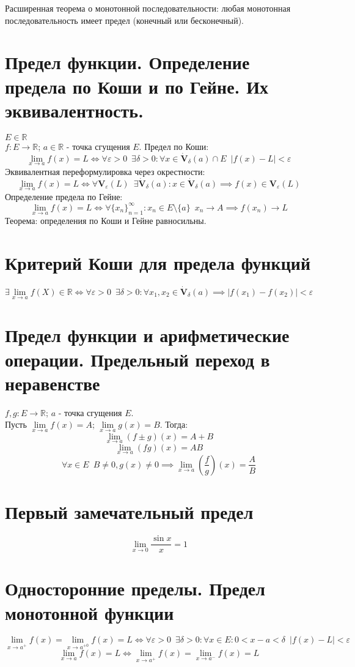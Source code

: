 \documentclass[11pt, a4paper, utf-8]{article}
\def\R{\mathbb{R}}
\def\sp{\, \, \,}
\def\lima{\lim \limits_{x \to a}}
\begin{document}
    Расширенная теорема о монотонной последовательности: любая монотонная последовательность имеет предел (конечный или бесконечный).

    \section{Предел функции. Определение предела по Коши и по Гейне. Их эквивалентность.}
    $E \in \R$\\
    $f: E \to \R$; $a \in \R$ - точка сгущения $E$. Предел по Коши:
    $$\lima f(x) = L \iff \forall \varepsilon > 0 \sp \exists \delta > 0 : \forall x \in \dot{\mathbf{V}}_{\delta}(a) \cap E \sp |f(x) - L| < \varepsilon$$
    Эквивалентная переформулировка через окрестности:
    $$\lima f(x) = L \iff \forall \mathbf{V}_{\varepsilon}(L) \sp \exists \dot{\mathbf{V}}_{\delta}(a) : x \in \dot{\mathbf{V}}_{\delta}(a) \implies f(x) \in \mathbf{V}_{\varepsilon}(L)$$
    Определение предела по Гейне:
    $$\lima f(x) = L \iff \forall \{x_n\}_{n = 1}^{\infty}: x_n \in E \setminus \{a\} \sp x_n \to A \implies f(x_n) \to L$$
    Теорема: определения по Коши и Гейне равносильны.
    
    \section{Критерий Коши для предела функций}
    $$\exists \lima f(X) \in \R \iff \forall \varepsilon > 0 \sp \exists \delta > 0: \forall x_1, x_2 \in \dot{\mathbf{V}}_{\delta}(a) \implies |f(x_1) - f(x_2)| < \varepsilon$$

    \section{Предел функции и арифметические операции. Предельный переход в неравенстве}
    $f,g : E \to \R$; $a$ - точка сгущения $E$.\\
    Пусть $\lima f(x) = A$; $\lima g(x) = B$. Тогда:
    $$\lima (f \pm g)(x) = A+B$$
    $$\lima (fg)(x) = AB$$
    $$\forall x \in E \sp B \neq 0, g(x) \neq 0 \implies \lima \left(\frac{f}{g}\right)(x) = \frac{A}{B}$$

    \section{Первый замечательный предел}
    $$\lim_{x \to 0} \frac{\sin x}{x} = 1$$

    \section{Односторонние пределы. Предел монотонной функции}
    $$\lim_{x \to a^+} f(x)= \lim_{x \to a^{+ 0}} f(x) = L \iff \forall \varepsilon > 0 \sp \exists \delta > 0 : \forall x \in E : 0 < x-a < \delta \sp |f(x) - L| < \varepsilon$$
    $$\lima f(x) = L \iff \lim_{x \to a^+} f(x) = \lim_{x \to a^-} f(x) = L$$
\end{document}
